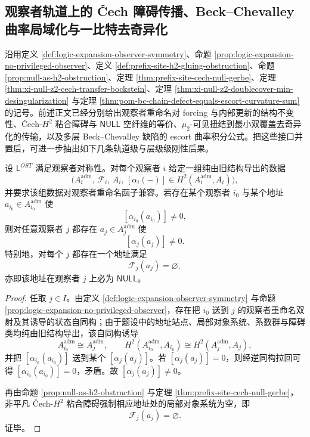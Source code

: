 \subsection{观察者轨道上的 Čech 障碍传播、Beck--Chevalley 曲率局域化与一比特去奇异化}\label{subsec:conclusion-observer-cech-bc-doublecover-quantization}
沿用定义 \ref{def:logic-expansion-observer-symmetry}、命题 \ref{prop:logic-expansion-no-privileged-observer}、定义 \ref{def:prefix-site-h2-gluing-obstruction}、命题 \ref{prop:null-as-h2-obstruction}、定理 \ref{thm:prefix-site-cech-null-gerbe}、定理 \ref{thm:xi-null-z2-cech-transfer-bockstein}、定理 \ref{thm:xi-null-z2-doublecover-min-desingularization} 与定理 \ref{thm:pom-bc-chain-defect-equals-escort-curvature-sum} 的记号。前述正文已经分别给出观察者重命名对 forcing 与内部更新的结构不变性、Čech-\(H^2\) 粘合障碍与 \(\mathsf{NULL}\) 空纤维的等价、\(\mu_2\)-可见扭结到最小双覆盖去奇异化的传输，以及多层 Beck--Chevalley 缺陷的 escort 曲率积分公式。把这些接口并置后，可进一步抽出如下几条轨道级与层级级刚性后果。

\begin{theorem}\label{thm:conclusion-observer-cech-null-propagation}
设 \(\mathsf L^{OST}\) 满足观察者对称性。对每个观察者 \(i\) 给定一组纯由旧结构导出的数据
\[
\bigl(A_i^{\mathrm{adm}},\,\mathscr F_i,\,A_i,\,[\alpha_i(-)]\in H^2(A_i^{\mathrm{adm}},A_i)\bigr),
\]
并要求该组数据对观察者重命名函子兼容。若存在某个观察者 \(i_0\) 与某个地址 \(a_{i_0}\in A_{i_0}^{\mathrm{adm}}\) 使
\[
[\alpha_{i_0}(a_{i_0})]\neq 0,
\]
则对任意观察者 \(j\) 都存在 \(a_j\in A_j^{\mathrm{adm}}\) 使
\[
[\alpha_j(a_j)]\neq 0.
\]
特别地，对每个 \(j\) 都存在一个地址满足
\[
\mathscr F_j(a_j)=\varnothing,
\]
亦即该地址在观察者 \(j\) 上必为 \(\mathsf{NULL}\)。
\end{theorem}
\begin{proof}
任取 \(j\in I\)。由定义 \ref{def:logic-expansion-observer-symmetry} 与命题 \ref{prop:logic-expansion-no-privileged-observer}，存在把 \(i_0\) 送到 \(j\) 的观察者重命名双射及其诱导的状态自同构；由于题设中的地址站点、局部对象系统、系数群与障碍类均纯由旧结构导出，该自同构诱导
\[
A_{i_0}^{\mathrm{adm}}\cong A_j^{\mathrm{adm}},
\qquad
H^2(A_{i_0}^{\mathrm{adm}},A_{i_0})\cong H^2(A_j^{\mathrm{adm}},A_j),
\]
并把 \([\alpha_{i_0}(a_{i_0})]\) 送到某个 \([\alpha_j(a_j)]\)。若 \([\alpha_j(a_j)]=0\)，则经逆同构拉回可得 \([\alpha_{i_0}(a_{i_0})]=0\)，矛盾。故 \([\alpha_j(a_j)]\neq 0\)。

再由命题 \ref{prop:null-as-h2-obstruction} 与定理 \ref{thm:prefix-site-cech-null-gerbe}，非平凡 Čech-\(H^2\) 粘合障碍强制相应地址处的局部对象系统为空，即
\[
\mathscr F_j(a_j)=\varnothing.
\]
证毕。
\end{proof}

